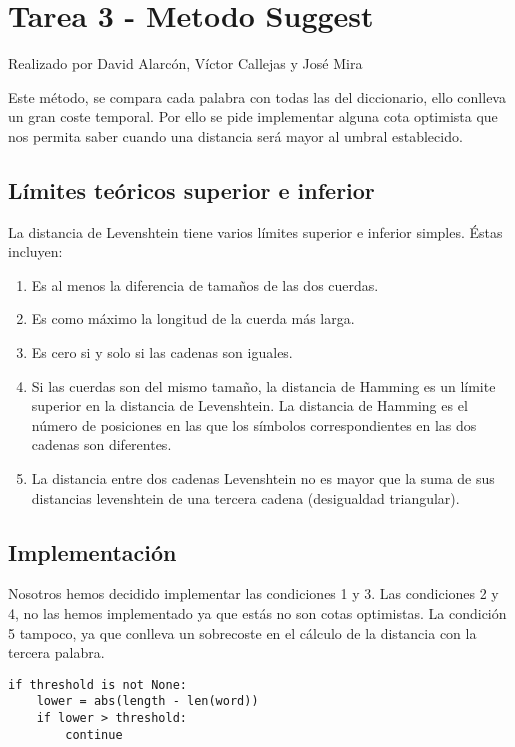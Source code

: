 \section{Tarea 3 - Metodo Suggest}
{\color{red}Realizado por David Alarcón, Víctor Callejas y José Mira}

Este método, se compara cada palabra con todas las del diccionario, ello conlleva un gran coste temporal.
Por ello se pide implementar alguna cota optimista que nos permita saber cuando una distancia será
mayor al umbral establecido.

\subsection{Límites teóricos superior e inferior}
La distancia de Levenshtein tiene varios límites superior e inferior simples. Éstas incluyen:
\begin{enumerate}
    \item Es al menos la diferencia de tamaños de las dos cuerdas.
    \item Es como máximo la longitud de la cuerda más larga.
    \item Es cero si y solo si las cadenas son iguales.
    \item Si las cuerdas son del mismo tamaño, la distancia de Hamming es un límite superior en la distancia de Levenshtein. La distancia de Hamming es el número de posiciones en las que los símbolos correspondientes en las dos cadenas son diferentes.
    \item La distancia entre dos cadenas Levenshtein no es mayor que la suma de sus distancias levenshtein de una tercera cadena (desigualdad triangular).
\end{enumerate}


\subsection{Implementación}

Nosotros hemos decidido implementar las condiciones 1 y 3.
Las condiciones 2 y 4, no las hemos implementado ya que estás no son cotas optimistas.
La condición 5 tampoco, ya que conlleva un sobrecoste en el cálculo de la distancia con la tercera palabra.

\begin{lstlisting}[caption=Condición 1]
if threshold is not None:
    lower = abs(length - len(word))
    if lower > threshold:
        continue
\end{lstlisting}

